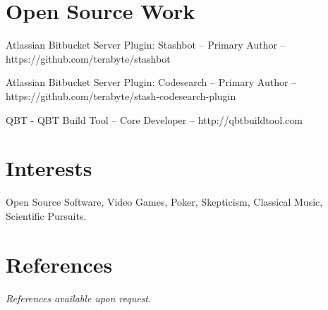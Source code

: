 \documentclass[margin,line]{resume}
\begin{document}
\begin{resume}
	\section{\mysidestyle Open Source Work} 
	\begin{list2}
	\item 
		Atlassian Bitbucket Server Plugin: Stashbot -- Primary Author -- https://github.com/terabyte/stashbot
	\item 
		Atlassian Bitbucket Server Plugin: Codesearch -- Primary Author -- https://github.com/terabyte/stash-codesearch-plugin
	\item 
		QBT - QBT Build Tool -- Core Developer -- http://qbtbuildtool.com
	\end{list2}
	\section{\mysidestyle Interests} 
	Open Source Software, Video Games, Poker, Skepticism, Classical Music, Scientific Pursuits.

	\section{\mysidestyle References}
	{\sl References available upon request.}
\end{resume}
\end{document}
